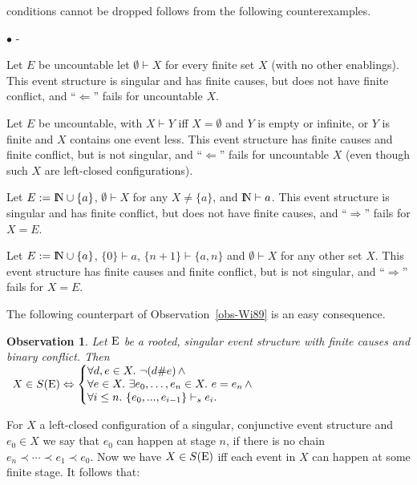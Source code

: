\documentclass[twocolumn]{article}
\newtheorem{obs}{Observation}[section]
\newenvironment{observation}[1]{\begin{obs} \rm \label{obs-#1} }{\end{obs}}
\newcommand{\ob}[1]{Observation~\ref{obs-#1}}
\newenvironment{itemise}{\begin{list}{$\bullet$}{\leftmargin 18pt
                        \labelwidth\leftmargini\advance\labelwidth-\labelsep
                        \topsep 4pt \itemsep 2pt \parsep 2pt}}{\end{list}}
\newcommand{\turn}{\vdash}                              \newcommand{\dbigcup}{\bigcup_{\uparrow}}		\newcommand{\nbigcup}{\bigcup_{\bullet}}		\newcommand{\nbigcap}{\bigcap_{\bullet}}		\newcommand{\bbigcup}{\overline{\bigcup}}		\newcommand{\bbigcap}{\overline{\bigcap}}		\newcommand{\nbbigcap}{\bbigcap_{\bullet}}		\newcommand{\fbbigcup}{\overline{\bigcup}^f}		\newcommand{\bbbigcup}{\overline{\bigcup}^2}		\newcommand{\dcup}{~~\makebox[0pt]{\LARGE$\cdot$}\makebox[0pt]{$\cup$}~~}
\newcommand{\dl}[1]{\mbox{\rm I\hspace{-0.75mm}#1}}     \newcommand{\dc}[1]{\mbox{\rm {\raisebox{.4ex}{\makebox [0pt][l]{\hspace{.2em}\scriptsize $\mid$}}}#1}}
\newcommand{\IN}{\dl{N}}                        \newcommand{\IQ}{\dc{Q}}                        \newcommand{\IC}{\dc{C}}                        \newcommand{\IE}{\dl{E}}                        \newcommand{\IG}{\dc{G}}                        \newcommand{\fC}{{\cal C}}                      \newcommand{\fE}{{\cal E}}                      \newcommand{\fG}{{\cal G}}                      \newcommand{\fN}{{\cal N}}                      \newcommand{\fF}{{\cal F}}                      \newcommand{\fL}{{\cal L}}                      \newcommand{\fM}{{\cal M}}                      \newcommand{\fS}{{\cal S}}                      \newcommand{\fR}{{\cal R}}                      \newcommand{\eC}{{\rm C}}                       \newcommand{\eD}{{\rm D}}                       \newcommand{\eE}{{\rm E}}                       \newcommand{\eF}{{\rm F}}                       \newcommand{\eG}{{\rm G}}                       \newcommand{\eH}{{\rm H}}                       \newcommand{\eK}{{\rm K}}                       \newcommand{\eL}{{\rm L}}                       \newcommand{\eN}{{\rm N}}                       \newcommand{\eP}{{\rm P}}                       \newcommand{\eM}{{\rm M}}                       \newcommand{\eT}{{\rm T}}                       \newcommand{\fT}{{\cal T}}
\begin{document}
conditions cannot be dropped follows from the following counterexamples.
\begin{itemise}
\item Let $E$ be uncountable let $\emptyset \turn X$ for every finite set
$X$ (with no other enablings). This event structure is singular
and has finite causes, but does not have finite conflict, and
``$\Leftarrow$'' fails for uncountable $X$.
\item Let $E$ be uncountable, with $X \turn Y$ iff $X=\emptyset$ and
$Y$ is empty or infinite, or $Y$ is finite and $X$ contains one event
less. This event structure has finite
causes and finite conflict, but is not singular, and ``$\Leftarrow$'' fails
for uncountable $X$ (even though such $X$ are left-closed configurations).
\item Let $E := \IN \cup \{a\}$, $\emptyset \turn X$ for any $X \neq
\{a\}$, and $\IN \turn a$. This event structure is singular and has
finite conflict, but does not have finite causes, and
``$\Rightarrow$'' fails for $X=E$.
\item Let $E := \IN \cup \{a\}$, $\{0\} \turn a$, $\{n+1\} \turn \{a,n\}$
and $\emptyset \turn X$ for any other set $X$. This event structure has
finite causes and finite conflict, but is not singular, and
``$\Rightarrow$'' fails for $X=E$.
\end{itemise}
The following counterpart of \ob{Wi89} is an easy consequence.

\begin{observation}{Wi89-secured}
Let $\eE$ be a rooted, singular event structure
with finite causes and binary conflict. Then\\[1.5ex]
\mbox{~}\hfill $X \in S(\eE) \Leftrightarrow \left\{\begin{array}{@{}l@{}}
\forall d,e \in X.~ \neg (d \# e) \, \wedge\\
\forall e \in X.~ \exists e_0, \ldots, e_n \in X.~ e=e_n\,
\wedge \\ \forall i\leq n.~ \{e_0,...,e_{i-1}\} \turn_s e_i.
\end{array}\right.$\hfill$\begin{array}{@{}c@{}}~\\\\\end{array}$
\end{observation}
For $X$ a left-closed configuration of a singular, conjunctive event
structure and $e_0\in X$ we say that $e_0$ can happen at stage $n$, if
there is no chain $e_n \prec \cdots \prec e_1 \prec e_0$.  Now we have
\pagebreak[2]
$X\in S(\eE)$ iff each event in $X$ can happen at some finite stage.
It follows that:
\end{document}
